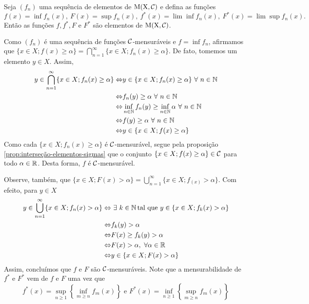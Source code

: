 \begin{theorem}
\label{teo:mensurabilidade-sequencia-funcoes-mensuraveis}
	Seja $(f_n)$ uma sequência de elementos de $\operatorname{M(X, \mathcal{C} )}$ e defina as funções
	$$f(x) = \inf f_n(x),\  
	F(x) = \sup f_n(x),\  
	f^*(x) = \lim\inf f_n(x),\   
	F^*(x) = \lim\sup f_n(x).$$
	Então as funções $f, f^*, F$ e $F^*$ são elementos de $\operatorname{M(X, \mathcal{C} )}$.
\end{theorem}
\begin{prova}
	Como $(f_n)$ é uma sequência de funções $\operatorname{\mathcal{C}}$-mensuráveis e $f = \inf f_n$, afirmamos que $\{x \in X; f(x) \geq \alpha\} = \displaystyle \bigcap_{n = 1}^\infty \{x \in X; f_n(x) \geq \alpha\}$.
	De fato, tomemos um elemento $y \in X$.
	Assim, 
		\begin{align*}
			y \in \bigcap_{n = 1}^\infty \{x \in X; f_n(x) \geq \alpha\} \Leftrightarrow	&
			y \in \{x \in X; f_n(x) \geq \alpha\}\ \forall\  n \in \N\\
			\Leftrightarrow	&	
			f_n(y) \geq \alpha\ \forall \ n \in \N\\
			\Leftrightarrow	&	
			\inf_{n \in \N}f_n(y) \geq \inf_{n \in \N}\alpha\ \forall \ n \in \N\\
			\Leftrightarrow	&	
			f(y) \geq \alpha\ \forall\  n \in \N\\
			\Leftrightarrow	&
			y \in \{x \in X; f(x) \geq \alpha\}
		\end{align*}
	Como cada $\{x \in X; f_n(x) \geq \alpha\}$ é $\operatorname{\mathcal{C}}$-mensurável, segue pela proposição \ref{prop:interseção-elementos-sigmas} que o conjunto $\{x \in X; f(x) \geq \alpha\} \in \operatorname{\mathcal{C}}$ para todo $\alpha \in \mathbb{R}$.
	Desta forma, $f$ é $\operatorname{\mathcal{C}}$-mensurável.
	
	Observe, também, que $\{x \in X; F(x) >\alpha\} = \displaystyle \bigcup_{n = 1}^\infty \{x \in X; f_(x) >\alpha\}$.
	Com efeito, para $y \in X$ 
	\begin{align*}
		y \in \bigcup_{n = 1}^\infty \{x \in X; f_n(x) > \alpha\} \Leftrightarrow	&
		\ \exists\ k \in \operatorname{\mathbb{N}} \textrm{tal que\ } y \in \{x \in X; f_k(x) > \alpha\}\\
		\Leftrightarrow	&	
		f_k(y) > \alpha\\
		\Leftrightarrow	&	
		F(x) \geq f_k(y) > \alpha\\
		\Leftrightarrow	&	
		F(x) > \alpha,\ \forall \alpha \in \mathbb{R}\\
		\Leftrightarrow	&
		y \in \{x \in X; F(x) > \alpha\}
	\end{align*}
	Assim, concluímos que $f$ e $F$ são $\operatorname{\mathcal{C}}$-mensuráveis. 
	Note que a mensurabilidade de $f^*$ e $F^*$ vem de $f$ e $F$ uma vez que
	$$
	f^*(x) = \sup_{n \geq 1} \left\{\inf_{m \geq n} f_m(x)\right\}
	\textrm{\ e\ }
	F^*(x) = \inf_{n \geq 1} \left\{\sup_{m \geq n} f_m(x)\right\}
	$$
\end{prova}

